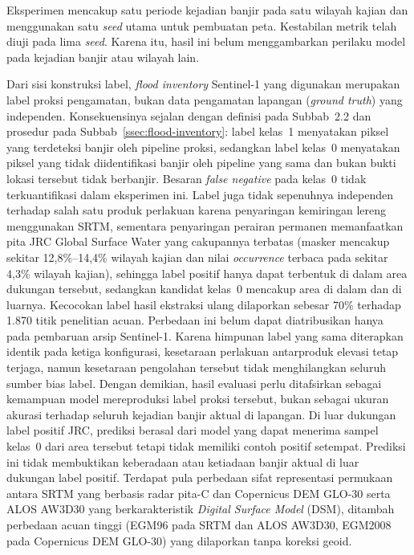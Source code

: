 \documentclass[12pt]{article}
\begin{document}
Eksperimen mencakup satu periode kejadian banjir pada satu wilayah kajian dan
menggunakan satu \textit{seed} utama untuk pembuatan peta. Kestabilan metrik
telah diuji pada lima \textit{seed}. Karena itu, hasil ini belum menggambarkan
perilaku model pada kejadian banjir atau wilayah lain.

Dari sisi konstruksi label, \textit{flood inventory} Sentinel-1 yang digunakan
merupakan label proksi pengamatan, bukan data pengamatan lapangan
(\textit{ground truth}) yang independen. Konsekuensinya sejalan dengan
definisi pada Subbab~2.2 dan prosedur pada
Subbab~\ref{ssec:flood-inventory}: label kelas~1 menyatakan piksel yang terdeteksi
banjir oleh pipeline proksi, sedangkan label kelas~0 menyatakan piksel yang
tidak diidentifikasi banjir oleh pipeline yang sama dan bukan bukti lokasi
tersebut tidak berbanjir. Besaran \textit{false negative} pada kelas~0 tidak
terkuantifikasi dalam eksperimen ini. Label juga tidak sepenuhnya
independen terhadap salah satu produk perlakuan karena penyaringan kemiringan
lereng menggunakan SRTM, sementara penyaringan perairan permanen memanfaatkan
pita JRC Global Surface Water yang cakupannya terbatas (masker mencakup
sekitar 12,8\%--14,4\% wilayah kajian dan nilai \textit{occurrence} terbaca
pada sekitar 4,3\% wilayah kajian), sehingga label positif hanya dapat
terbentuk di dalam area dukungan tersebut, sedangkan kandidat kelas~0
mencakup area di dalam dan di luarnya. Kecocokan label hasil ekstraksi
ulang dilaporkan sebesar 70\% terhadap 1.870 titik penelitian acuan.
Perbedaan ini belum dapat diatribusikan hanya pada pembaruan arsip
Sentinel-1. Karena himpunan label yang sama diterapkan identik
pada ketiga konfigurasi, kesetaraan perlakuan antarproduk elevasi tetap
terjaga, namun kesetaraan pengolahan tersebut tidak menghilangkan seluruh
sumber bias label. Dengan demikian, hasil evaluasi perlu ditafsirkan sebagai
kemampuan model mereproduksi label proksi tersebut, bukan sebagai ukuran
akurasi terhadap seluruh kejadian banjir aktual di lapangan. Di luar
dukungan label positif JRC, prediksi berasal dari model yang dapat menerima
sampel kelas~0 dari area tersebut tetapi tidak memiliki contoh positif
setempat. Prediksi ini tidak membuktikan keberadaan atau ketiadaan banjir
aktual di luar dukungan label positif.
Terdapat pula perbedaan sifat representasi permukaan antara SRTM yang
berbasis radar pita-C dan Copernicus DEM GLO-30 serta ALOS AW3D30 yang
berkarakteristik \textit{Digital Surface Model} (DSM), ditambah perbedaan
acuan tinggi (EGM96 pada SRTM dan ALOS AW3D30, EGM2008 pada Copernicus
DEM GLO-30) yang dilaporkan tanpa koreksi geoid.
\end{document}
